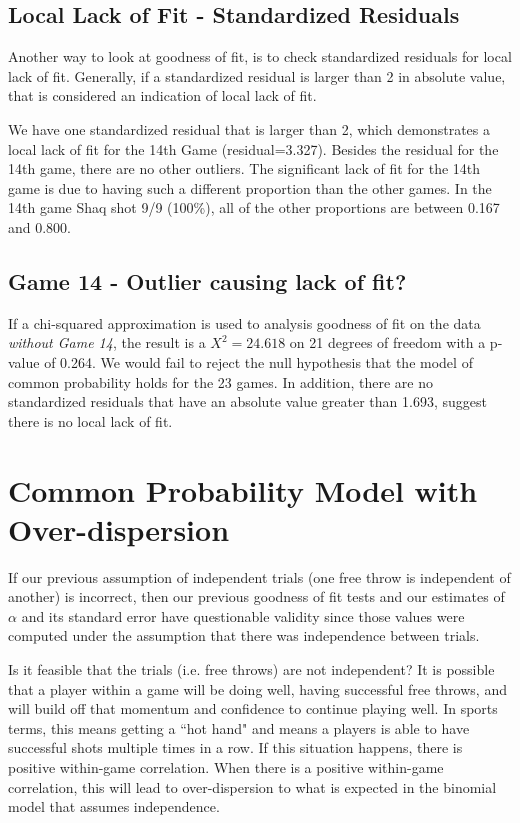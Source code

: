 \documentclass[12pt, letterpaper]{article}
\begin{document}
\subsection{Local Lack of Fit - Standardized Residuals} 
Another way to look at goodness of fit, is to check standardized residuals for local lack of fit.  Generally, if a standardized residual is larger than 2 in absolute value, that is considered an indication of local lack of fit.  

We  have one standardized residual that is larger than 2, which demonstrates a local lack of fit for the 14th Game (residual=3.327).  Besides the residual for the 14th game, there are no other outliers.  The significant lack of fit for the 14th game is due to having such a different proportion than the other games.  In the 14th game Shaq shot 9/9 (100\%), all of the other proportions are between 0.167 and 0.800. 


\subsection{Game 14 - Outlier causing lack of fit?}
If a chi-squared approximation is used to analysis goodness of fit on the data \textit{without Game 14}, the result is a $X^2 = 24.618$ on 21 degrees of freedom with a p-value of 0.264.  We would fail to reject the null hypothesis that the model of common probability holds for the 23 games.  In addition, there are no standardized residuals that have an absolute value greater than 1.693, suggest there is no local lack of fit.  

\section{Common Probability Model with Over-dispersion} 
If our previous assumption of independent trials (one free throw is independent of another) is incorrect, then our previous goodness of fit tests and our estimates of $\alpha$ and its standard error have questionable validity since those values were computed under the assumption that there was independence between trials.   

Is it feasible that the trials (i.e. free throws) are not independent? It is possible that a player within a game will be doing well, having successful free throws, and will build off that momentum and confidence to continue playing well.  In sports terms, this means getting a ``hot hand" and means a players is able to have successful shots multiple times in a row.  If this situation happens, there is positive within-game correlation.  When there is a positive within-game correlation, this will lead to over-dispersion to what is expected in the binomial model that assumes independence.  
\end{document}
